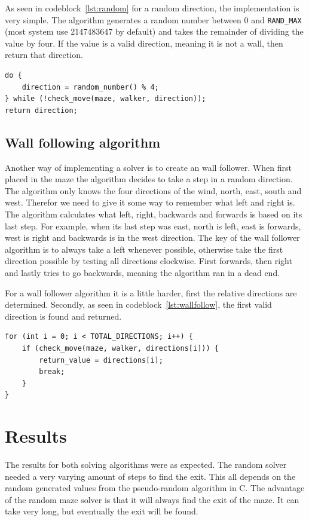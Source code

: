 \documentclass[a4paper,12pt]{article}
\begin{document}
As seen in codeblock~\ref{lst:random} for a random direction, the implementation is very simple. The algorithm generates a random number between 0 and \verb|RAND_MAX| (most system use 2147483647 by default) and takes the remainder of dividing the value by four. If the value is a valid direction, meaning it is not a wall, then return that direction.
\begin{lstlisting}[caption={Random solver algorithm},label={lst:random}]
do {
    direction = random_number() % 4;
} while (!check_move(maze, walker, direction));
return direction;
\end{lstlisting}



\subsection{Wall following algorithm}
Another way of implementing a solver is to create an wall follower. When first placed in the maze the algorithm decides to take a step in a random direction. The algorithm only knows the four directions of the wind, north, east, south and west. Therefor we need to give it some way to remember what left and right is. The algorithm calculates what left, right, backwards and forwards is based on its last step. For example, when its last step was east, north is left, east is forwards, west is right and backwards is in the west direction. The key of the wall follower algorithm is to always take a left whenever possible, otherwise take the first direction possible by testing all directions clockwise. First forwards, then right and lastly tries to go backwards, meaning the algorithm ran in a dead end.

For a wall follower algorithm it is a little harder, first the relative directions are determined. Secondly, as seen in codeblock~\ref{lst:wallfollow}, the first valid direction is found and returned.
\begin{lstlisting}[caption={Wall following algorithm},label={lst:wallfollow}]
for (int i = 0; i < TOTAL_DIRECTIONS; i++) {
    if (check_move(maze, walker, directions[i])) {
        return_value = directions[i];
        break;
    }
}

\end{lstlisting}

\section{Results}
The results for both solving algorithms were as expected. The random solver needed a very varying amount of steps to find the exit. This all depends on the random generated values from the pseudo-random algorithm in C. The advantage of the random maze solver is that it will always find the exit of the maze. It can take very long, but eventually the exit will be found.
\end{document}
